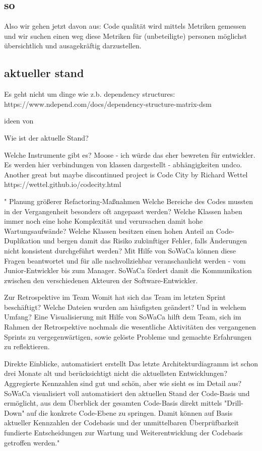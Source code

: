 \subsection{so}
Also wir gehen jetzt davon aus:
Code qualität wird mittels Metriken gemessen und wir suchen einen weg diese Metriken für (unbeteiligte) personen möglichst übersichtlich und ausagekräftig darzustellen.

\subsection{aktueller stand}
Es geht nicht um dinge wie z.b. dependency structures: https://www.ndepend.com/docs/dependency-structure-matrix-dsm


ideen von \cite{ennowulff_2021}

Wie ist der aktuelle Stand?


Welche Instrumente gibt es?
Moose - ich würde das eher bewreten für entwickler. Es werden hier verbindungen von klassen dargestellt - abhängigkeiten undco.
Another great but maybe discontinued project is Code City by Richard Wettel
https://wettel.github.io/codecity.html

"
Planung größerer Refactoring-Maßnahmen
Welche Bereiche des Codes mussten in der Vergangenheit besonders oft angepasst werden? Welche Klassen haben immer noch eine hohe Komplexität und verursachen damit hohe Wartungsaufwände? Welche Klassen besitzen einen hohen Anteil an Code-Duplikation und bergen damit das Risiko zukünftiger Fehler, falls Änderungen nicht konsistent durchgeführt werden? Mit Hilfe von SoWaCa können diese Fragen beantwortet und für alle nachvollziehbar veranschaulicht werden - vom Junior-Entwickler bis zum Manager. SoWaCa fördert damit die Kommunikation zwischen den verschiedenen Akteuren der Software-Entwickler.

Zur Retrospektive im Team
Womit hat sich das Team im letzten Sprint beschäftigt? Welche Dateien wurden am häufigsten geändert? Und in welchem Umfang? Eine Visualisierung mit Hilfe von SoWaCa hilft dem Team, sich im Rahmen der Retrospektive nochmals die wesentliche Aktivitäten des vergangenen Sprints zu vergegenwärtigen, sowie gelöste Probleme und gemachte Erfahrungen zu reflektieren.

Direkte Einblicke, automatisiert erstellt
Das letzte Architekturdiagramm ist schon drei Monate alt und berücksichtigt nicht die aktuellsten Entwicklungen? Aggregierte Kennzahlen sind gut und schön, aber wie sieht es im Detail aus? SoWaCa visualisiert voll automatisiert den aktuellen Stand der Code-Basis und ermöglicht, aus dem Überblick der gesamten Code-Basis direkt mittels "Drill-Down" auf die konkrete Code-Ebene zu springen. Damit können auf Basis aktueller Kennzahlen der Codebasis und der unmittelbaren Überprüfbarkeit fundierte Entscheidungen zur Wartung und Weiterentwicklung der Codebasis getroffen werden."
\cite{systect_2015}



